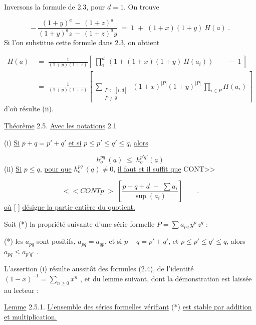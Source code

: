 Inversons la formule de 2.3, pour $d = 1$. On trouve

\begin{equation*}
-\ \frac{(1+y)^{a} \,-\, (1+z)^{a}}{(1+y)^{a}z \,-\, (1+z)^{a}y} \;=\; 1 \;+\; (1+x)(1+y)\ H(a)\ .
\end{equation*}
Si l'on substitue cette formule dans 2.3, on obtient

\begin{equation*}
\begin{aligned}
H(\underline{a}) \;&=\; \frac{1}{(1+y)(1+z)}\left[\ \prod_{1}^{d}\ (1+(1+x)(1+y)\ H(a_{i}))\qquad -\ 1\ \right]\\[2ex]
&=\;\frac{1}{(1+y)(1+z)}\left[\ \sum_{\substack{P \subset [i,d] \\ P \neq \emptyset}}\ (1+x)^{|P|}(1+y)^{|P|}\ \prod_{i \in P} H(a_{i})\ \right]
\end{aligned}
\end{equation*}
d'où résulte (ii).

\underline{Théorème} 2.5. \underline{Avec les notations} 2.1

(i) \quad \underline{Si} $p+q = p'+q'$ \underline{et si} $p \leq p' \leq q' \leq q$, \underline{alors}

\begin{equation*}
h_{o}^{pq}\ (\underline{a}) \;\leq\; h_{o}^{p'q'}(\underline{a})
\end{equation*}
(ii) \quad \underline{Si} $p \leq q$, \underline{pour que} $h_{o}^{pq}\ (\underline{a}) \neq 0$, \underline{il faut et il suffit que} CONT>>



\begin{equation*}
<<CONT p \;>\; \left[\frac{p+q+d \;-\; \sum a_i}{\sup(a_i)}\right] \qquad .
\end{equation*}
\underline{où} [ ] \underline{désigne la partie entière du quotient.}

Soit (*) la propriété suivante d'une série formelle $P = \sum a_{pq} \, y^p \, z^q$ :

(*)  les $a_{pq}$ sont positifs, $a_{pq} = a_{qp}$, et si $p+q = p'+q'$, et $p \leqslant p' \leqslant q' \leqslant q$, alors $a_{pq} \leqslant a_{p'q'}$ .

L'assertion (i) résulte aussitôt des formules (2.4), de l'identité $(1-x)^{-1} = \sum_{n \geqslant 0} x^n$ , et du lemme suivant, dont la démonstration est laissée au lecteur :

\underline{Lemme} 2.5.1. \underline{L'ensemble des séries formelles vérifiant} (*) \underline{est stable par addition et multiplication.}

